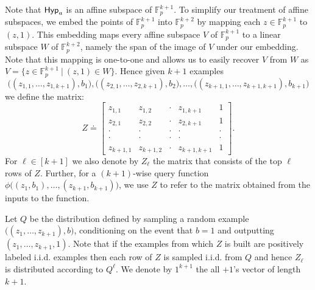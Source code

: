 Note that $\mathsf{Hyp}_a$ is an affine subspace of $\mathbb{F}_p^{k+1}$. To simplify our treatment of affine subspaces, we embed the points of $\mathbb{F}_p^{k+1}$ into $\mathbb{F}_p^{k+2}$ by mapping each $z \in \mathbb{F}_p^{k+1}$ to $(z,1)$. This embedding maps every affine subspace $V$ of $\mathbb{F}_p^{k+1}$ to a linear subspace $W$ of $\mathbb{F}_p^{k+2}$, namely the span of the image of $V$ under our embedding. Note that this mapping is one-to-one and allows us to easily recover $V$ from $W$ as $V = \{z \in \mathbb{F}_p^{k+1} \ | \ (z,1) \in W\}$.  Hence given $k+1$ examples
$$\big((z_{1,1}, \dots, z_{1,k+1}),b_1\big),\big((z_{2,1}, \dots, z_{2,k+1}),b_2\big), \dots, \big((z_{k+1,1}, \dots, z_{k+1,k+1}),b_{k+1}\big)$$  we define the matrix:
\begin{equation}\label{eq:Z_mat_def}
Z \doteq
\begin{bmatrix}
z_{1,1}       & z_{1,2} &  \cdot & z_{1,k+1} & 1 \\
z_{2,1}       & z_{2,2} & \cdot & z_{2,k+1} & 1 \\
\cdot       & \cdot & \cdot & \cdot & \cdot \\
\cdot       & \cdot & \cdot & \cdot & \cdot \\
z_{k+1,1}       & z_{k+1,2} & \cdot & z_{k+1,k+1} & 1
\end{bmatrix}.
\end{equation}
For $\ell \in [k+1]$ we also denote by $Z_\ell$ the matrix that consists of the top $\ell$ rows of $Z$.  Further, for a $(k+1)$-wise query function $\phi\big((z_1,b_1),\ldots,(z_{k+1},b_{k+1})  \big)$, we use $Z$ to refer to the matrix obtained from the inputs to the function.

Let $Q$ be the distribution defined by sampling a random example $\big((z_{1}, \dots, z_{k+1}),b\big)$, conditioning on the event that $b=1$ and outputting $(z_{1}, \dots, z_{k+1},1)$. Note that if the examples from which $Z$ is built are positively labeled i.i.d. examples then each row of $Z$ is sampled i.i.d. from $Q$ and hence $Z_\ell$ is distributed according to $Q^\ell$.
We denote by $1^{k+1}$ the all $+1$'s vector of length $k+1$.

